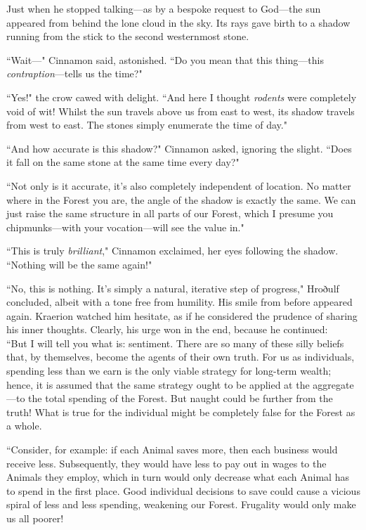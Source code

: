 

Just when he stopped talking---as by a bespoke request to God---the sun appeared from behind the lone cloud in the sky.
Its rays gave birth to a shadow running from the stick to the second westernmost stone.

``Wait---" Cinnamon said, astonished.
``Do you mean that this thing---this \textit{contraption}---tells us the time?"

``Yes!" the crow cawed with delight.
``And here I thought \textit{rodents} were completely void of wit!
Whilst the sun travels above us from east to west, its shadow travels from west to east.
The stones simply enumerate the time of day."

``And how accurate is this shadow?" Cinnamon asked, ignoring the slight.
``Does it fall on the same stone at the same time every day?"

``Not only is it accurate, it's also completely independent of location.
No matter where in the Forest you are, the angle of the shadow is exactly the same.
We can just raise the same structure in all parts of our Forest, which I presume you chipmunks---with your vocation---will see the value in."

``This is truly \textit{brilliant}," Cinnamon exclaimed, her eyes following the shadow.
``Nothing will be the same again!"

``No, this is nothing.
It's simply a natural, iterative step of progress," Hroðulf concluded, albeit with a tone free from humility.
His smile from before appeared again.
Kraerion watched him hesitate, as if he considered the prudence of sharing his inner thoughts.
Clearly, his urge won in the end, because he continued:\\

``But I will tell you what is: sentiment.
There are so many of these silly beliefs that, by themselves, become the agents of their own truth.
For us as individuals, spending less than we earn is the only viable strategy for long-term wealth; hence, it is assumed that the same strategy ought to be applied at the aggregate---to the total spending of the Forest.
But naught could be further from the truth!
What is true for the individual might be completely false for the Forest as a whole.

``Consider, for example: if each Animal saves more, then each business would receive less.
Subsequently, they would have less to pay out in wages to the Animals they employ, which in turn would only decrease what each Animal has to spend in the first place.
Good individual decisions to save could cause a vicious spiral of less and less spending, weakening our Forest.
Frugality would only make us all poorer!

